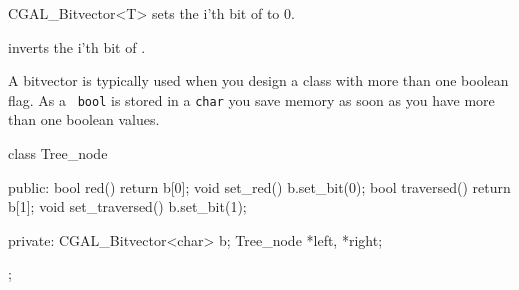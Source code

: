 \begin {classtemplate} {CGAL_Bitvector<T>}
       {sets the i'th bit of \var to 0.}

       {inverts the i'th bit of \var.}


\example

A bitvector is typically used when you design a class
with more than one boolean flag. As a \leda\ {\tt bool} 
is stored in a {\tt char} you save memory as soon as
you have more than one boolean values.

\begin{cprog}

  class Tree_node {
  public:
    bool red() {return b[0];}
    void set_red() { b.set_bit(0);}
    bool traversed() {return b[1];}
    void set_traversed() { b.set_bit(1);}
    
  private:
    CGAL_Bitvector<char> b;
    Tree_node *left, *right;
  };
\end{cprog} 

\end {classtemplate} 

%
%
